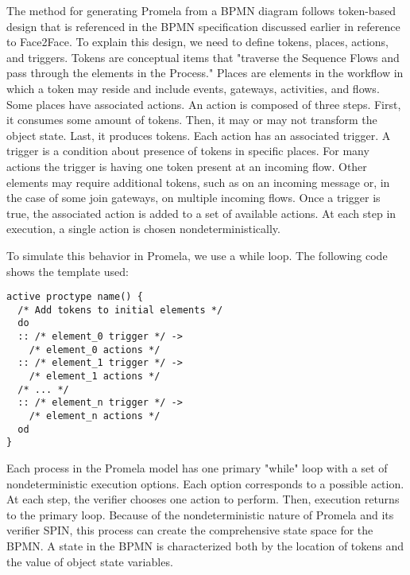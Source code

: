 The method for generating Promela from a BPMN diagram follows token-based design that is referenced in the BPMN specification \cite{BPMNSpecification} discussed earlier in reference to Face2Face. To explain this design, we need to define tokens, places, actions, and triggers. Tokens are conceptual items that "traverse the Sequence Flows and pass through the elements in the Process." \cite{BPMNSpecification} Places are elements in the workflow in which a token may reside and include events, gateways, activities, and flows. Some places have associated actions. An action is composed of three steps. First, it consumes some amount of tokens. Then, it may or may not transform the object state. Last, it produces tokens. Each action has an associated trigger. A trigger is a condition about presence of tokens in specific places. For many actions the trigger is having one token present at an incoming flow. Other elements may require additional tokens, such as on an incoming message or, in the case of some join gateways, on multiple incoming flows. Once a trigger is true, the associated action is added to a set of available actions. At each step in execution, a single action is chosen nondeterministically.

To simulate this behavior in Promela, we use a while loop. The following code shows the template used: 

\begin{lstlisting}[style=myPromela]
active proctype name() {
  /* Add tokens to initial elements */
  do
  :: /* element_0 trigger */ ->
    /* element_0 actions */
  :: /* element_1 trigger */ ->
    /* element_1 actions */
  /* ... */  
  :: /* element_n trigger */ ->
    /* element_n actions */
  od
}
\end{lstlisting}

Each process in the Promela model has one primary "while" loop with a set of nondeterministic execution options. Each option corresponds to a possible action. At each step, the verifier chooses one action to perform. Then, execution returns to the primary loop. Because of the nondeterministic nature of Promela and its verifier SPIN, this process can create the comprehensive state space for the BPMN. A state in the BPMN is characterized both by the location of tokens and the value of object state variables. 